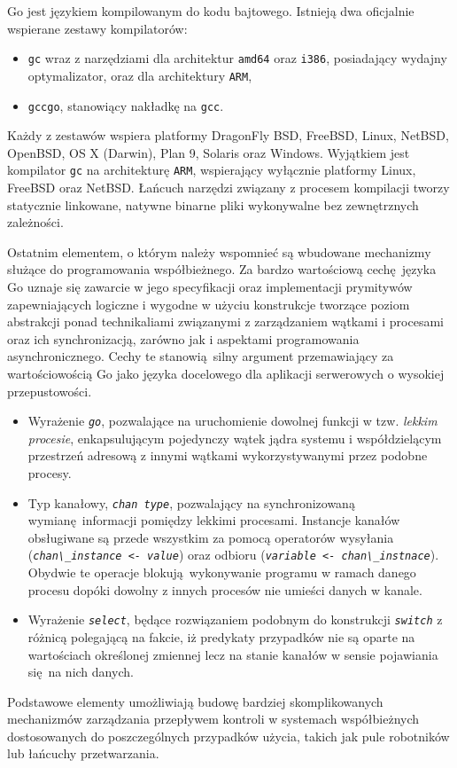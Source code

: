 \par{
  Go jest językiem kompilowanym do kodu bajtowego. Istnieją dwa oficjalnie wspierane zestawy kompilatorów:
  \begin{itemize}
    \item \texttt{gc} wraz z narzędziami dla architektur \texttt{amd64} oraz \texttt{i386}, posiadający wydajny optymalizator, oraz dla architektury \texttt{ARM},
    \item \texttt{gccgo}, stanowiący nakładkę na \texttt{gcc}.
  \end{itemize}
  Każdy z zestawów wspiera platformy DragonFly BSD, FreeBSD, Linux, NetBSD, OpenBSD, OS X (Darwin), Plan 9, Solaris oraz Windows. Wyjątkiem jest kompilator \texttt{gc} na architekturę \texttt{ARM}, wspierający wyłącznie platformy Linux, FreeBSD oraz NetBSD. \cite{godoc:compilers}
  Łańcuch narzędzi związany z procesem kompilacji tworzy statycznie linkowane, natywne binarne pliki wykonywalne bez zewnętrznych zależności.
}

\par{
  Ostatnim elementem, o którym należy wspomnieć są wbudowane mechanizmy służące do programowania współbieżnego.
  Za bardzo wartościową cechę języka Go uznaje się zawarcie w jego specyfikacji oraz implementacji prymitywów zapewniających logiczne i wygodne w użyciu konstrukcje tworzące poziom abstrakcji ponad technikaliami związanymi z zarządzaniem wątkami i procesami oraz ich synchronizacją, zarówno jak i aspektami programowania asynchronicznego.
  Cechy te stanowią silny argument przemawiający za wartościowością Go jako języka docelowego dla aplikacji serwerowych o wysokiej przepustowości.
  \begin{itemize}
    \item Wyrażenie \textit{\lstinline{go}}, pozwalające na uruchomienie dowolnej funkcji w tzw. \emph{lekkim procesie}, enkapsulującym pojedynczy wątek jądra systemu i współdzielącym przestrzeń adresową z innymi wątkami wykorzystywanymi przez podobne procesy.
    \item Typ kanałowy, \textit{\lstinline{chan type}}, pozwalający na synchronizowaną wymianę informacji pomiędzy lekkimi procesami. Instancje kanałów obsługiwane są przede wszystkim za pomocą operatorów wysyłania (\textit{\lstinline{chan\_instance <- value}}) oraz odbioru (\textit{\lstinline{variable <- chan\_instnace}}). Obydwie te operacje blokują wykonywanie programu w ramach danego procesu dopóki dowolny z innych procesów nie umieści danych w kanale.
    \item Wyrażenie \textit{\lstinline{select}}, będące rozwiązaniem podobnym do konstrukcji \textit{\lstinline{switch}} z różnicą polegającą na fakcie, iż predykaty przypadków nie są oparte na wartościach określonej zmiennej lecz na stanie kanałów w sensie pojawiania się na nich danych.
  \end{itemize}
  Podstawowe elementy umożliwiają budowę bardziej skomplikowanych mechanizmów zarządzania przepływem kontroli w systemach współbieżnych dostosowanych do poszczególnych przypadków użycia, takich jak pule robotników lub łańcuchy przetwarzania.
}